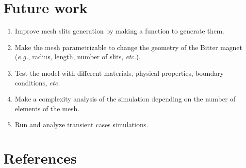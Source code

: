 \documentclass[12pt]{article}
\begin{document}
\section{Future work}
\begin{enumerate}
  \item Improve mesh slits generation by making a function to generate them.
  \item Make the mesh parametrizable to change the geometry of the Bitter magnet
    (\textit{e.g.}, radius, length, number of slits, \textit{etc.}).
  \item Test the model with different materials, physical properties, boundary conditions, \textit{etc.}
  \item Make a complexity analysis of the simulation depending on the number of elements of the mesh.
  \item Run and analyze transient cases simulations.
\end{enumerate}

\newpage

\section{References}
\printbibliography
\end{document}
